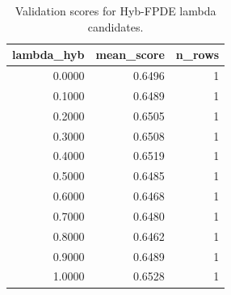 \begin{table}[t]
\caption{Validation scores for Hyb-FPDE lambda candidates.}
\label{tab:lambda_distribution_computed}
\centering
\begin{tabular}{rrr}
\toprule
lambda\_hyb & mean\_score & n\_rows \\
\midrule
0.0000 & 0.6496 & 1 \\
0.1000 & 0.6489 & 1 \\
0.2000 & 0.6505 & 1 \\
0.3000 & 0.6508 & 1 \\
0.4000 & 0.6519 & 1 \\
0.5000 & 0.6485 & 1 \\
0.6000 & 0.6468 & 1 \\
0.7000 & 0.6480 & 1 \\
0.8000 & 0.6462 & 1 \\
0.9000 & 0.6489 & 1 \\
1.0000 & 0.6528 & 1 \\
\bottomrule
\end{tabular}

\end{table}
